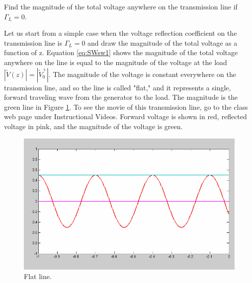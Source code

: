 \documentclass{ximera}
\begin{document}
\begin{example}

Find the magnitude of the total voltage anywhere on the transmission line if $\Gamma_L=0$.

\begin{explanation}
 Let us start from a simple case when the voltage reflection coefficient on the
transmission line is $\Gamma_L=0$ and draw the magnitude of the total
voltage as a function of z. Equation \ref{eq:SWsw1} shows the magnitude of the total voltage anywhere on the line is equal to the magnitude of the voltage at the load $|\tilde{V}(z)|= |\tilde{V}_0^+|$.  The magnitude of the voltage is constant everywhere on the transmission line, and so the line
is called "flat," and it represents a single, forward traveling wave from the generator to the load. The magnitude is the green line in Figure \ref{fig:SWflatline}. To see the movie
of this transmission line, go to the class web page under Instructional Videos. Forward voltage is shown in red, reflected voltage in pink,
and the magnitude of the voltage is green.




\begin{figure}[htbp]
\begin{center}
\includegraphics[scale=0.3]{../jpg/flatline.jpg}
\end{center}
\caption{Flat line.}
\label{fig:SWflatline}
\end{figure}
\end{explanation}

\end{example}
\end{document}

